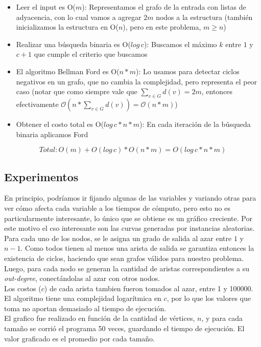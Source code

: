 \begin{itemize}
	\item Leer el input es O($m$): Representamos el grafo de la entrada con listas de adyacencia, con lo cual vamos a agregar $2m$ nodos a la estructura (también inicializamos la estructura en O($n$), pero en este problema, $m \geq n$)
	\item Realizar una búsqueda binaria es O($log \, c$): Buscamos el máximo $k$ entre $1$ y $c+1$ que cumple el criterio que buscamos
	\item El algoritmo Bellman Ford es O($n*m$): Lo usamos para detectar ciclos negativos en un grafo, que no cambia la complejidad, pero representa el peor caso (notar que como siempre vale que $\sum_{v \in G} d(v) = 2m$, entonces efectivamente $\mathcal{O}(n*\sum_{v \in G} d(v)) = \mathcal{O}(n*m)$)
	\item Obtener el costo total es O($log \, c *n*m$): En cada iteración de la búsqueda binaria aplicamos Ford
\end{itemize}

$$Total:  O(m) + O(log \, c) * O(n*m) = O(log \, c *n*m) $$

\subsection{Experimentos}

En principio, podríamos ir fijando algunas de las variables y variando otras para ver cómo afecta cada variable a los tiempos de cómputo, pero esto no es particularmente interesante, lo único que se obtiene es un gráfico creciente. Por este motivo el cso interesante son las curvas generadas por instancias aleatorias.\\

Para cada uno de los nodos, se le asigna un grado de salida al azar entre $1$ y $n-1$. Como todos tienen al menos una arista de salida se garantiza entonces la existencia de ciclos, haciendo que sean grafos válidos para nuestro problema. Luego, para cada nodo se generan la cantidad de aristas correspondientes a su \textit{out-degree}, conectándolas al azar con otros nodos. \\

Los costos ($c$) de cada arista tambien fueron tomados al azar, entre 1 y 100000. El algoritmo tiene una complejidad logarítmica en $c$, por lo que los valores que toma no aportan demasiado al tiempo de ejecución. \\

El grafico fue realizado en función de la cantidad de vértices, $n$, y para cada tamaño se corrió el programa 50 veces,
guardando el tiempo de ejecución. El valor graficado es el promedio por cada tamaño. \\

